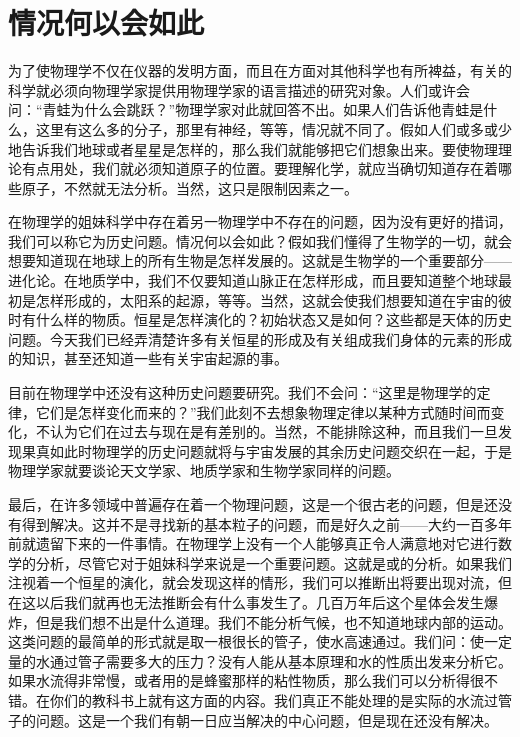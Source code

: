\section{情况何以会如此}

为了使物理学不仅在仪器的发明方面，而且在方面对其他科学也有所裨益，有关的科学就必须向物理学家提供用物理学家的语言描述的研究对象。人们或许会问：“青蛙为什么会跳跃？”物理学家对此就回答不出。如果人们告诉他青蛙是什么，这里有这么多的分子，那里有神经，等等，情况就不同了。假如人们或多或少地告诉我们地球或者星星是怎样的，那么我们就能够把它们想象出来。要使物理理论有点用处，我们就必须知道原子的位置。要理解化学，就应当确切知道存在着哪些原子，不然就无法分析。当然，这只是限制因素之一。

在物理学的姐妹科学中存在着另一物理学中不存在的问题，因为没有更好的措词，我们可以称它为历史问题。情况何以会如此？假如我们懂得了生物学的一切，就会想要知道现在地球上的所有生物是怎样发展的。这就是生物学的一个重要部分——进化论。在地质学中，我们不仅要知道山脉正在怎样形成，而且要知道整个地球最初是怎样形成的，太阳系的起源，等等。当然，这就会使我们想要知道在宇宙的彼时有什么样的物质。恒星是怎样演化的？初始状态又是如何？这些都是天体的历史问题。今天我们已经弄清楚许多有关恒星的形成及有关组成我们身体的元素的形成的知识，甚至还知道一些有关宇宙起源的事。

目前在物理学中还没有这种历史问题要研究。我们不会问：“这里是物理学的定律，它们是怎样变化而来的？”我们此刻不去想象物理定律以某种方式随时间而变化，不认为它们在过去与现在是有差别的。当然，不能排除这种，而且我们一旦发现果真如此时物理学的历史问题就将与宇宙发展的其余历史问题交织在一起，于是物理学家就要谈论天文学家、地质学家和生物学家同样的问题。

最后，在许多领域中普遍存在着一个物理问题，这是一个很古老的问题，但是还没有得到解决。这并不是寻找新的基本粒子的问题，而是好久之前——大约一百多年前就遗留下来的一件事情。在物理学上没有一个人能够真正令人满意地对它进行数学的分析，尽管它对于姐妹科学来说是一个重要问题。这就是或的分析。如果我们注视着一个恒星的演化，就会发现这样的情形，我们可以推断出将要出现对流，但在这以后我们就再也无法推断会有什么事发生了。几百万年后这个星体会发生爆炸，但是我们想不出是什么道理。我们不能分析气候，也不知道地球内部的运动。这类问题的最简单的形式就是取一根很长的管子，使水高速通过。我们问：使一定量的水通过管子需要多大的压力？没有人能从基本原理和水的性质出发来分析它。如果水流得非常慢，或者用的是蜂蜜那样的粘性物质，那么我们可以分析得很不错。在你们的教科书上就有这方面的内容。我们真正不能处理的是实际的水流过管子的问题。这是一个我们有朝一日应当解决的中心问题，但是现在还没有解决。

